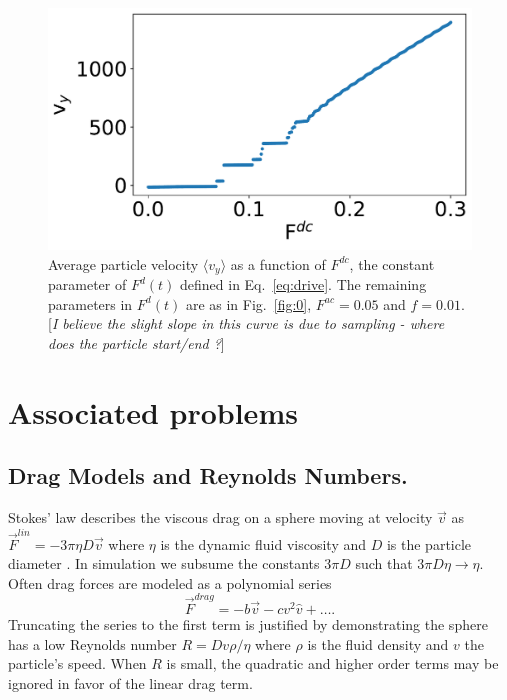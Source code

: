 \documentclass[twocolumn,preprintnumbers,amsmath,amssymb,aps,prx]{revtex4}
\begin{document}
\begin{center}
\begin{figure}[h!]
\centering
\includegraphics[width=\columnwidth]{sweep_FDC_vs_vx.pdf}
\caption{Average particle velocity  $\langle v_{y} \rangle$ as a function of $F^{dc}$,
  the constant parameter of $F^d(t)$ defined in Eq.~\ref{eq:drive}.
  The remaining parameters in $F^d(t)$ are as in Fig.~\ref{fig:0}, $F^{ac}=0.05$ and $f = 0.01$. [{\it I believe the slight slope in this curve is due to sampling - where does the particle start/end ?}]}
\label{fig:1}
\end{figure}
\end{center}


\section{Associated problems}
\label{sec:problems}	%

\subsection{Drag Models and Reynolds Numbers.}
  Stokes' law describes the viscous drag on a sphere
  moving at velocity $\vec{v}$ as 
  $\vec{F}^{lin} = -3 \pi \eta D \vec{v}$ 
  where $\eta$ is the dynamic fluid viscosity and 
  $D$ is the particle diameter \cite{Taylor2005}.
  In simulation we
  subsume the constants $3 \pi D$
  such that $3 \pi D \eta \rightarrow \eta $.
  Often drag forces are
  modeled as a polynomial series ~\cite{Taylor2005}
  \begin{equation}
    \vec{F}^{drag} = -b \vec{v} - c v^2 \hat{v} + \ldots  .
  \end{equation}
  Truncating the series to the first term
  is justified by demonstrating the sphere
  has a low Reynolds number  
  $R = D v \rho / \eta$
  where $\rho$ is the fluid density and $v$ the particle's speed.
  When $R$ is small, the quadratic and higher order terms
  may be ignored in favor of the linear drag term.
\end{document}
